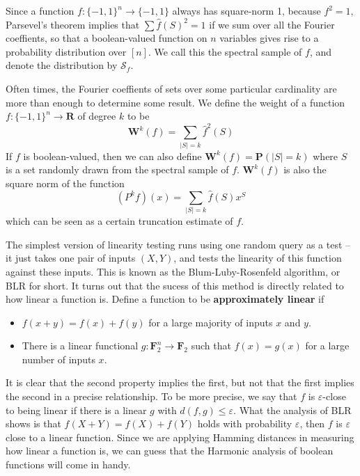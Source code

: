 Since a function $f: \{ -1, 1 \}^n \to \{ -1, 1 \}$ always has square-norm 1, because $f^2 = 1$, Parsevel's theorem implies that $\sum \widehat{f}(S)^2 = 1$ if we sum over all the Fourier coeffients, so that a boolean-valued function on $n$ variables gives rise to a probability distribution over $[n]$. We call this the spectral sample of $f$, and denote the distribution by $\mathcal{S}_f$.

Often times, the Fourier coeffients of sets over some particular cardinality are more than enough to determine some result. We define the weight of a function $f: \{ -1, 1 \}^n \to \mathbf{R}$ of degree $k$ to be
%
\[ \mathbf{W}^k(f) = \sum_{|S| = k} \widehat{f}^2(S) \]
%
If $f$ is boolean-valued, then we can also define $\mathbf{W}^k(f) = \mathbf{P}(|S| = k)$ where $S$ is a set randomly drawn from the spectral sample of $f$. $\mathbf{W}^k(f)$ is also the square norm of the function
%
\[ (P^kf)(x) = \sum_{|S| = k} \widehat{f}(S) x^S \]
%
which can be seen as a certain truncation estimate of $f$.

The simplest version of linearity testing runs using one random query as a test -- it just takes one pair of inputs $(X,Y)$, and tests the linearity of this function against these inputs. This is known as the Blum-Luby-Rosenfeld algorithm, or BLR for short. It turns out that the sucess of this method is directly related to how linear a function is. Define a function to be {\bf approximately linear} if
%
\begin{itemize}
    \item $f(x + y) = f(x) + f(y)$ for a large majority of inputs $x$ and $y$.
    \item There is a linear functional $g: \mathbf{F}_2^n \to \mathbf{F}_2$ such that $f(x) = g(x)$ for a large number of inputs $x$.
\end{itemize}
%
It is clear that the second property implies the first, but not that the first implies the second in a precise relationship. To be more precise, we say that $f$ is $\varepsilon$-close to being linear if there is a linear $g$ with $d(f,g) \leq \varepsilon$. What the analysis of BLR shows is that $f(X + Y) = f(X) + f(Y)$ holds with probability $\varepsilon$, then $f$ is $\varepsilon$ close to a linear function. Since we are applying Hamming distances in measuring how linear a function is, we can guess that the Harmonic analysis of boolean functions will come in handy.

